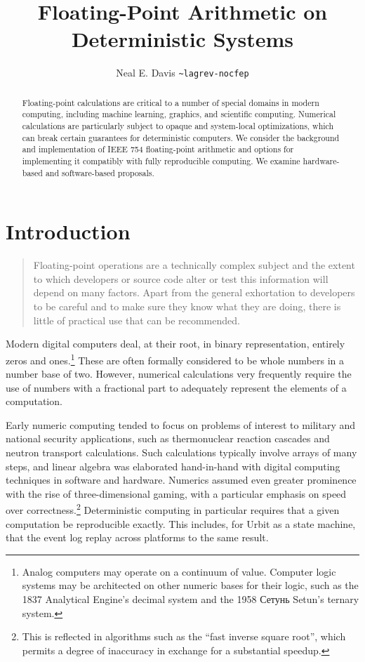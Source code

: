 \documentclass[twoside]{article}
\title{Floating-Point Arithmetic on Deterministic Systems}
\author{Neal E. Davis \texttt{\textasciitilde lagrev-nocfep}}
\begin{document}
\maketitle
\thispagestyle{firststyle}

\begin{abstract}
Floating-point calculations are critical to a number of special domains in modern computing, including machine learning, graphics, and scientific computing.  Numerical calculations are particularly subject to opaque and system-local optimizations, which can break certain guarantees for deterministic computers.  We consider the background and implementation of IEEE 754 floating-point arithmetic and options for implementing it compatibly with fully reproducible computing.  We examine hardware-based and software-based proposals.
\end{abstract}

\tableofcontents

\section{Introduction}

\begin{quote}
Floating-point operations are a technically complex subject and the extent to which developers or source code alter or test this information will depend on many factors. Apart from the general exhortation to developers to be careful and to make sure they know what they are doing, there is little of practical use that can be recommended.  \citep[p.~197]{Jones2008}
\end{quote}

Modern digital computers deal, at their root, in binary representation, entirely zeros and ones.\footnote{Analog computers may operate on a continuum of value.  Computer logic systems may be architected on other numeric bases for their logic, such as the 1837 Analytical Engine's decimal system and the 1958 Сетунь Setun's ternary system.}  These are often formally considered to be whole numbers in a number base of two.  However, numerical calculations very frequently require the use of numbers with a fractional part to adequately represent the elements of a computation.

Early numeric computing tended to focus on problems of interest to military and national security applications, such as thermonuclear reaction cascades and neutron transport calculations.  Such calculations typically involve arrays of many steps, and linear algebra was elaborated hand-in-hand with digital computing techniques in software and hardware.  Numerics assumed even greater prominence with the rise of three-dimensional gaming, with a particular emphasis on speed over correctness.\footnote{This is reflected in algorithms such as the “fast inverse square root”, which permits a degree of inaccuracy in exchange for a substantial speedup.}  Deterministic computing in particular requires that a given computation be reproducible exactly.  This includes, for Urbit as a state machine, that the event log replay across platforms to the same result.
\end{document}
